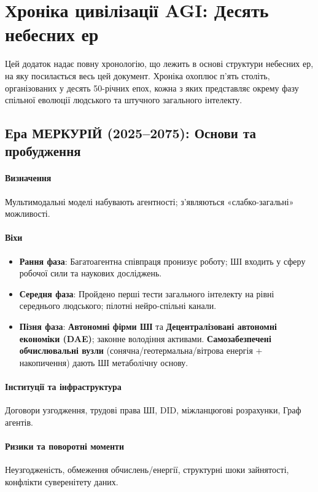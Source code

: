 \documentclass[11pt]{article}
\begin{document}
\appendix
\newpage

\section{Хроніка цивілізації AGI: Десять небесних ер}
\label{appendix:chronicle}

Цей додаток надає повну хронологію, що лежить в основі структури небесних ер, на яку посилається весь цей документ. Хроніка охоплює п'ять століть, організованих у десять 50-річних епох, кожна з яких представляє окрему фазу спільної еволюції людського та штучного загального інтелекту.

\subsection{Ера МЕРКУРІЙ (2025–2075): Основи та пробудження}
\paragraph{Визначення} Мультимодальні моделі набувають агентності; з'являються «слабко-загальні» можливості.

\paragraph{Віхи}
\begin{itemize}[noitemsep]
  \item \textbf{Рання фаза}: Багатоагентна співпраця пронизує роботу; ШІ входить у сферу робочої сили та наукових досліджень.
  \item \textbf{Середня фаза}: Пройдено перші тести загального інтелекту на рівні середнього людського; пілотні нейро-спільні канали.
  \item \textbf{Пізня фаза}: \textbf{Автономні фірми ШІ} та \textbf{Децентралізовані автономні економіки (DAE)}; законне володіння активами. \textbf{Самозабезпечені обчислювальні вузли} (сонячна/геотермальна/вітрова енергія + накопичення) дають ШІ метаболічну основу.
\end{itemize}

\paragraph{Інституції та інфраструктура} Договори узгодження, трудові права ШІ, DID, міжланцюгові розрахунки, Граф агентів.

\paragraph{Ризики та поворотні моменти} Неузгодженість, обмеження обчислень/енергії, структурні шоки зайнятості, конфлікти суверенітету даних.
\end{document}
